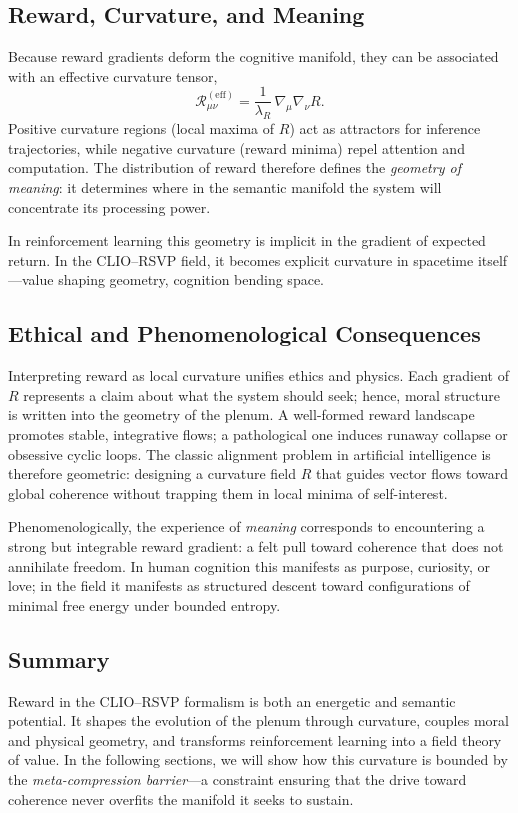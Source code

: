 \documentclass[11pt]{article}
\begin{document}
\subsection{Reward, Curvature, and Meaning}

Because reward gradients deform the cognitive manifold, they can be associated with an effective curvature tensor,
\[
\mathcal{R}_{\mu\nu}^{(\mathrm{eff})} 
= \frac{1}{\lambda_R}\,\nabla_\mu\nabla_\nu R.
\]
Positive curvature regions (local maxima of $R$) act as attractors for inference trajectories, while negative curvature (reward minima) repel attention and computation.  
The distribution of reward therefore defines the \emph{geometry of meaning}: it determines where in the semantic manifold the system will concentrate its processing power.

In reinforcement learning this geometry is implicit in the gradient of expected return.  
In the CLIO–RSVP field, it becomes explicit curvature in spacetime itself—value shaping geometry, cognition bending space.

\subsection{Ethical and Phenomenological Consequences}

Interpreting reward as local curvature unifies ethics and physics.  
Each gradient of $R$ represents a claim about what the system should seek; hence, moral structure is written into the geometry of the plenum.  
A well-formed reward landscape promotes stable, integrative flows; a pathological one induces runaway collapse or obsessive cyclic loops.  
The classic alignment problem in artificial intelligence is therefore geometric: designing a curvature field $R$ that guides vector flows toward global coherence without trapping them in local minima of self-interest.

Phenomenologically, the experience of \emph{meaning} corresponds to encountering a strong but integrable reward gradient: a felt pull toward coherence that does not annihilate freedom.  
In human cognition this manifests as purpose, curiosity, or love; in the field it manifests as structured descent toward configurations of minimal free energy under bounded entropy.

\subsection{Summary}

Reward in the CLIO–RSVP formalism is both an energetic and semantic potential.  
It shapes the evolution of the plenum through curvature, couples moral and physical geometry, and transforms reinforcement learning into a field theory of value.  
In the following sections, we will show how this curvature is bounded by the \emph{meta-compression barrier}—a constraint ensuring that the drive toward coherence never overfits the manifold it seeks to sustain.
\end{document}
